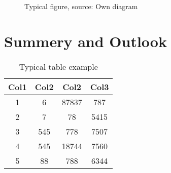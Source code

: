 \documentclass[
	english,    %
	thesis,    %
]{scientific}
\begin{document}
\begin{figure}[ht]
	\centering
	\caption{Typical figure, source: Own diagram}
	\label{fig:1}
\end{figure}

\chapter{Summery and Outlook}

\begin{table}[h!]
	\centering
	\begin{tabular}{||c c c c||}
    \hline
    Col1 & Col2 & Col2 & Col3 \\ [0.5ex] 
    \hline\hline
    1 & 6 & 87837 & 787 \\ 
    2 & 7 & 78 & 5415 \\
    3 & 545 & 778 & 7507 \\
    4 & 545 & 18744 & 7560 \\
    5 & 88 & 788 & 6344 \\ [1ex]
    \hline
    \end{tabular}
	\caption{Typical table example}
	\label{table:1}
\end{table}

\nocite{*}
\makebibliography
\listoffigures
\listoftables
\end{document}
